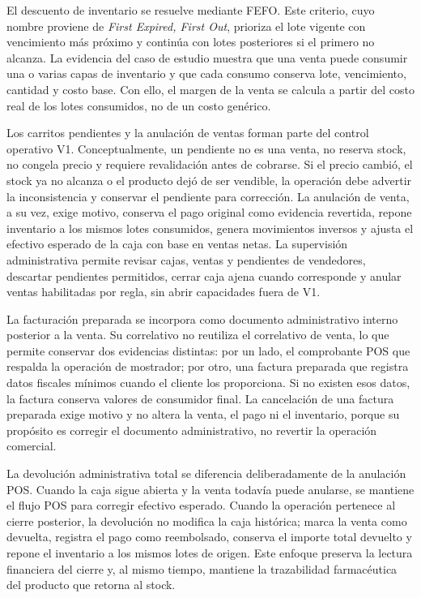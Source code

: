 El descuento de inventario se resuelve mediante FEFO. Este criterio, cuyo nombre proviene de \textit{First Expired, First Out}, prioriza el lote vigente con vencimiento más próximo y continúa con lotes posteriores si el primero no alcanza. La evidencia del caso de estudio muestra que una venta puede consumir una o varias capas de inventario y que cada consumo conserva lote, vencimiento, cantidad y costo base. Con ello, el margen de la venta se calcula a partir del costo real de los lotes consumidos, no de un costo genérico.

Los carritos pendientes y la anulación de ventas forman parte del control operativo V1. Conceptualmente, un pendiente no es una venta, no reserva stock, no congela precio y requiere revalidación antes de cobrarse. Si el precio cambió, el stock ya no alcanza o el producto dejó de ser vendible, la operación debe advertir la inconsistencia y conservar el pendiente para corrección. La anulación de venta, a su vez, exige motivo, conserva el pago original como evidencia revertida, repone inventario a los mismos lotes consumidos, genera movimientos inversos y ajusta el efectivo esperado de la caja con base en ventas netas. La supervisión administrativa permite revisar cajas, ventas y pendientes de vendedores, descartar pendientes permitidos, cerrar caja ajena cuando corresponde y anular ventas habilitadas por regla, sin abrir capacidades fuera de V1.

La facturación preparada se incorpora como documento administrativo interno posterior a la venta. Su correlativo no reutiliza el correlativo de venta, lo que permite conservar dos evidencias distintas: por un lado, el comprobante POS que respalda la operación de mostrador; por otro, una factura preparada que registra datos fiscales mínimos cuando el cliente los proporciona. Si no existen esos datos, la factura conserva valores de consumidor final. La cancelación de una factura preparada exige motivo y no altera la venta, el pago ni el inventario, porque su propósito es corregir el documento administrativo, no revertir la operación comercial.

La devolución administrativa total se diferencia deliberadamente de la anulación POS. Cuando la caja sigue abierta y la venta todavía puede anularse, se mantiene el flujo POS para corregir efectivo esperado. Cuando la operación pertenece al cierre posterior, la devolución no modifica la caja histórica; marca la venta como devuelta, registra el pago como reembolsado, conserva el importe total devuelto y repone el inventario a los mismos lotes de origen. Este enfoque preserva la lectura financiera del cierre y, al mismo tiempo, mantiene la trazabilidad farmacéutica del producto que retorna al stock.

